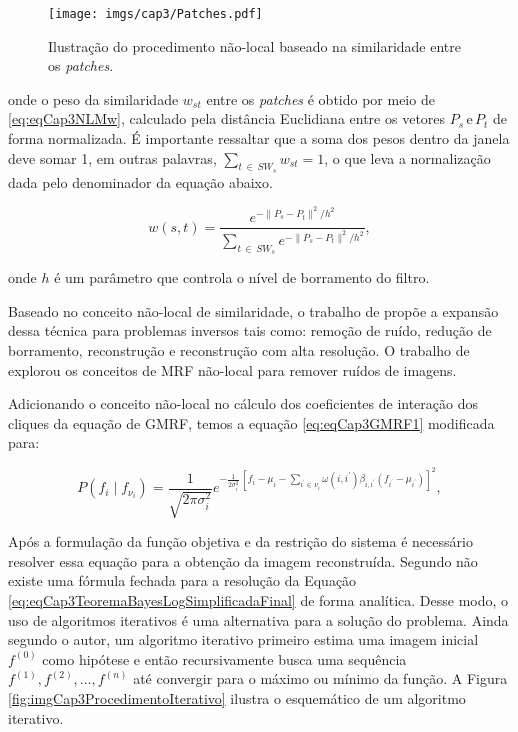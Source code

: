 {{\begin{figure}[H]
	\caption{Ilustração do procedimento não-local baseado na similaridade entre os \textit{patches}.}
	\begin{center}
		\texttt{[image: imgs/cap3/Patches.pdf]}
	\end{center}
	\label{fig:imgCap3Patches}
\end{figure}

\noindent onde o peso da similaridade $w_{st}$ entre os \textit{patches} é obtido por meio de \eqref{eq:eqCap3NLMw}, calculado pela distância Euclidiana entre os vetores $P_{s}\, \text{e}\, P_{t}$ de forma normalizada. É importante ressaltar que a soma dos pesos dentro da janela deve somar 1, em outras palavras, $\sum_{t\,\in \,SW_{s}}^{}w_{st} = 1$, o que leva a normalização dada pelo denominador da equação abaixo.

\begin{equation}
w(s,t) = \dfrac{e^{-\|P_{s} - P_{t}\|^{2}/h^{2}}}{\sum_{t\,\in \,SW_{s}}^{}e^{-\|P_{s} - P_{t}\|^{2}/h^{2}}},
\label{eq:eqCap3NLMw}
\end{equation}

\noindent onde $h$ é um parâmetro que controla o nível de borramento do filtro. 

Baseado no conceito não-local de similaridade, o trabalho de  propõe a expansão dessa técnica para problemas inversos tais como: remoção de ruído, redução de borramento, reconstrução e reconstrução com alta resolução. O trabalho de  explorou os conceitos de \acs{MRF} não-local para remover ruídos de imagens.

Adicionando o conceito não-local no cálculo dos coeficientes de interação dos cliques da equação de \acs{GMRF}, temos a equação \eqref{eq:eqCap3GMRF1} modificada para:

\begin{equation}
P(f_{i} \mid f_{\nu_{i}}) = \dfrac{1}{\sqrt{2 \pi \sigma^{2}_{i}}}  e^{-\frac{1}{2\sigma^{2}_{i}} \, [f_{i}-\mu_{i}-\sum_{i^{'}\in \,\nu_{i}}^{} \omega(i,i^{'})\beta_{i,i^{'}}(f_{i^{'}} - \mu_{i^{'}}) ]^{2} },
\label{eq:eqCap3GMRFNL}
\end{equation}     

Após a formulação da função objetiva e da restrição do sistema é necessário resolver essa equação para a obtenção da imagem reconstruída. Segundo  não existe uma fórmula fechada para a resolução da Equação \ref{eq:eqCap3TeoremaBayesLogSimplificadaFinal} de forma analítica. Desse modo, o uso de algoritmos iterativos é uma alternativa para a solução do problema. Ainda segundo o autor, um algoritmo iterativo primeiro estima uma imagem inicial $f^{(0)}$ como hipótese e então recursivamente busca uma sequência $f^{(1)}, f^{(2)}, \dots , f^{(n)}$ até convergir para o máximo ou mínimo da função. A Figura \ref{fig:imgCap3ProcedimentoIterativo} ilustra o esquemático de um algoritmo iterativo.


}}

